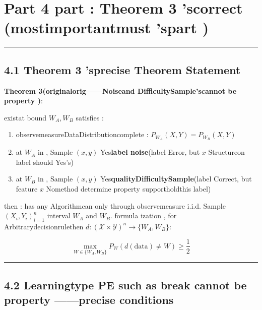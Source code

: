 \documentclass[
  12pt,
]{article}
\providecommand{\tightlist}{%
  \setlength{\itemsep}{0pt}\setlength{\parskip}{0pt}}
\begin{document}
\section{Part 4 part : Theorem 3
'scorrect (mostimportantmust 'spart )}\label{ux7b2c-4-ux90e8ux5206theorem-3-ux7684ux4feeux6b63ux6700ux91cdux8981ux7684ux90e8ux5206}

\begin{center}\rule{0.5\linewidth}{0.5pt}\end{center}

\subsection{4.1  Theorem 3
'sprecise Theorem Statement}\label{ux539f-theorem-3-ux7684ux7cbeux786eux5b9aux7406ux9648ux8ff0}

\textbf{Theorem 3(originalorig------Noiseand DifficultySample'scannot be property )}: 

existat bound  \(W_A, W_B\) satisfies : 

\begin{enumerate}
\def\labelenumi{\arabic{enumi}.}
\tightlist
\item
  observemeasureDataDistributioncomplete : \(P_{W_A}(X, Y) = P_{W_B}(X, Y)\)
\item
  at  \(W_A\) in , Sample \((x, y)\) Yes\textbf{label noise}(label Error, but 
  \(x\) Structureon  label should Yes's)
\item
  at  \(W_B\) in , Sample \((x, y)\) Yes\textbf{qualityDifficultySample}(label
  Correct, but feature \(x\) Nomethod determine property supportholdthis label)
\end{enumerate}

then : has any Algorithmcan only through observemeasure i.i.d. Sample \((X_i, Y_i)_{i=1}^n\) interval
\(W_A\) and  \(W_B\). formula ization , for Arbitrarydecisionrulethen 
\(d: (\mathcal{X} \times \mathcal{Y})^n \to \{W_A, W_B\}\): 

\[\max_{W \in \{W_A, W_B\}} P_W(d(\text{data}) \neq W) \geq \frac{1}{2}\]

\begin{center}\rule{0.5\linewidth}{0.5pt}\end{center}

\subsection{4.2 Learningtype  PE
such as break cannot be property ------precise conditions}\label{ux5b66ux4e60ux578b-pe-ux5982ux4f55ux7834ux574fux4e0dux53efux533aux5206ux6027ux7cbeux786eux6761ux4ef6}
\end{document}
